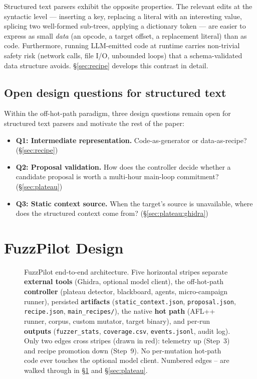 \documentclass[11pt]{article}
\newcommand{\circled}[1]{\tikz[baseline=(C.base)]{%
  \node[draw,circle,inner sep=0.5pt,minimum size=2.6mm,
        fill=red!75!black,text=white,font=\tiny\bfseries,
        line width=0.3pt](C){#1};}}
\begin{document}
Structured text parsers exhibit the opposite properties. The
relevant edits at the syntactic level --- inserting a key, replacing
a literal with an interesting value, splicing two well-formed
sub-trees, applying a dictionary token --- are easier to express as
small \emph{data} (an opcode, a target offset, a replacement
literal) than as code. Furthermore, running LLM-emitted code at
runtime carries non-trivial safety risk (network calls, file I/O,
unbounded loops) that a schema-validated data structure avoids.
\S\ref{sec:recipe} develops this contrast in detail.

\subsection{Open design questions for structured text}
\label{sec:bg:openq}

Within the off-hot-path paradigm, three design questions remain
open for structured text parsers and motivate the rest of the
paper:

\begin{itemize}
  \item \textbf{Q1: Intermediate representation.} Code-as-generator
  or data-as-recipe? (\S\ref{sec:recipe})
  \item \textbf{Q2: Proposal validation.} How does the controller
  decide whether a candidate proposal is worth a multi-hour main-loop
  commitment? (\S\ref{sec:plateau})
  \item \textbf{Q3: Static context source.} When the target's source
  is unavailable, where does the structured context come
  from? (\S\ref{sec:plateau:ghidra})
\end{itemize}

\section{FuzzPilot Design}
\label{sec:design}

\begin{figure}[p]
  \centering
  \resizebox{\textwidth}{!}{}
  \caption{FuzzPilot end-to-end architecture. Five horizontal stripes
  separate \textbf{external tools} (Ghidra, optional model client), the
  off-hot-path \textbf{controller} (plateau detector, blackboard,
  agents, micro-campaign runner), persisted \textbf{artifacts}
  (\texttt{static\_context.json}, \texttt{proposal.json},
  \texttt{recipe.json}, \texttt{main\_recipes/}), the native
  \textbf{hot path} (AFL++ runner, corpus, custom mutator, target
  binary), and per-run \textbf{outputs} (\texttt{fuzzer\_stats},
  \texttt{coverage.csv}, \texttt{events.jsonl}, audit log). Only two
  edges cross stripes (drawn in
  \textcolor{red!70!black}{red}): telemetry up (Step~3)
  and recipe promotion down (Step~9). No
  per-mutation hot-path code ever touches the optional model client. Numbered edges
  \protect\circled{1}--\protect\circled{9} are walked through in
  \S\ref{sec:design} and \S\ref{sec:plateau}.}
  \label{fig:arch}
\end{figure}
\end{document}
